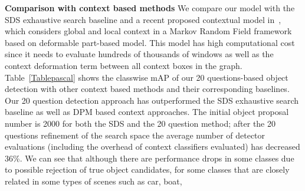 
{\bf Comparison with context based methods} We compare our model with the SDS exhaustive search baseline and a recent proposed contextual model in~\cite{mottaghi2014role}, which considers global and local context in a Markov Random Field framework based on deformable part-based model. This model has high computational cost since it needs to evaluate hundreds of thousands of windows as well as the context deformation term between all context boxes in the graph. Table~\ref{Tablepascal} shows the classwise mAP of our 20 questions-based object detection with other context based methods and their corresponding baselines.  Our 20 question detection approach has outperformed the SDS exhaustive search baseline as well as DPM based context approaches. The initial object proposal number is 2000 for both the SDS and the 20 question method; after the 20 questions refinement of the search space the average number of detector evaluations (including the overhead of context classifiers evaluated) has decreased 36\%. We can see that although there are performance drops in some classes due to possible rejection of true object candidates, for some classes that are closely related in some types of scenes such as car, boat, 


